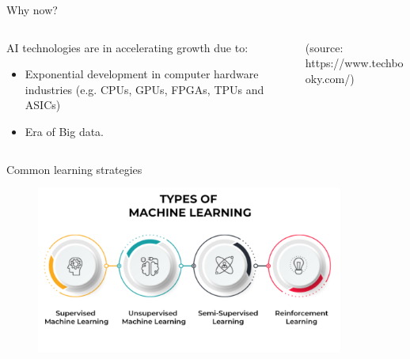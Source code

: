 \documentclass[10pt,aspectratio=169,dvipsnames]{beamer} %
\begin{document}
	\setcounter{subfigure}{0}
	\begin{frame}{Why now?}
		\begin{columns}[T]
			\begin{column}[c]{0.4\textwidth}
				AI technologies are in accelerating growth due to:
				\begin{itemize}
					\item Exponential development in computer hardware industries
					(e.g. CPUs, GPUs, FPGAs, TPUs and ASICs)
					\item Era of Big data.
				\end{itemize}
			\end{column}
			\begin{column}[c]{0.55\textwidth}
				\begin{figure}
					\centering
				\end{figure}
				\tiny
				(source: https://www.techbooky.com/)
			\end{column}
		\end{columns}		
	\end{frame}
	\setcounter{subfigure}{0}
	\begin{frame}{Common learning strategies}
		\centering
		\begin{figure}
			\includegraphics[width=0.9\textwidth]{learning.png}
		\end{figure}
	\end{frame}
\end{document}
